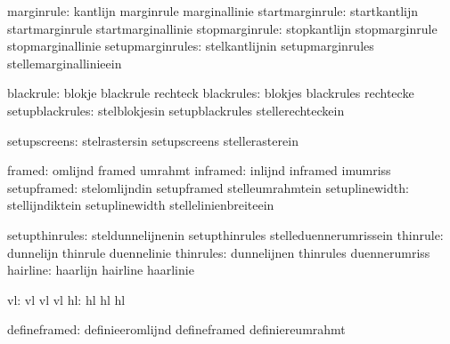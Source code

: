                    marginrule:  kantlijn                     marginrule
                                marginallinie
              startmarginrule:  startkantlijn                startmarginrule
                                startmarginallinie
               stopmarginrule:  stopkantlijn                 stopmarginrule
                                stopmarginallinie
             setupmarginrules:  stelkantlijnin               setupmarginrules
                                stellemarginallinieein

                    blackrule:  blokje                       blackrule
                                rechteck
                   blackrules:  blokjes                      blackrules
                                rechtecke
              setupblackrules:  stelblokjesin                setupblackrules
                                stellerechteckein

                 setupscreens:  stelrastersin                setupscreens
                                stellerasterein

                       framed:  omlijnd                      framed
                                umrahmt
                     inframed:  inlijnd                      inframed
                                imumriss
                  setupframed:  stelomlijndin                setupframed
                                stelleumrahmtein
               setuplinewidth:  stellijndiktein              setuplinewidth
                                stellelinienbreiteein

               setupthinrules:  steldunnelijnenin            setupthinrules
                                stelleduennerumrissein
                     thinrule:  dunnelijn                    thinrule
                                duennelinie
                    thinrules:  dunnelijnen                  thinrules
                                duennerumriss
                     hairline:  haarlijn                     hairline
                                haarlinie

                           vl:  vl                           vl
                                vl
                           hl:  hl                           hl
                                hl

                 defineframed:  definieeromlijnd             defineframed
                                definiereumrahmt

